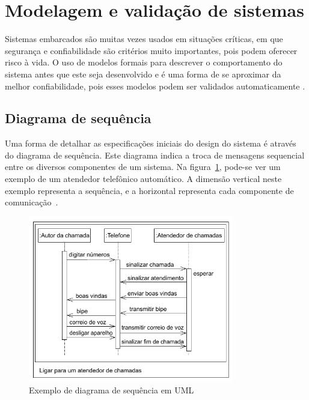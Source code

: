 

\section{Modelagem e validação de sistemas}
\label{sec:modelosformais}
Sistemas embarcados são muitas vezes usados em situações críticas, em que segurança e confiabilidade são critérios muito importantes, pois podem oferecer risco à vida. O uso de modelos formais para descrever o comportamento do sistema antes que este seja desenvolvido e é uma forma de se aproximar da melhor confiabilidade, pois esses modelos podem ser validados automaticamente \cite{edwards:1997}.

\subsection{Diagrama de sequência}
Uma forma de detalhar as especificações iniciais do design do sistema é através do diagrama de sequência. Este diagrama indica a troca de mensagens sequencial entre os diversos componentes de um sistema. Na figura~\ref{fig:seq_chart}, pode-se ver um exemplo de um atendedor telefônico automático. A dimensão vertical neste exemplo representa a sequência, e a horizontal representa cada componente de comunicação~\cite{marwedel:2010}.

\begin{figure}[!ht]
	\caption{\label{fig:seq_chart}Exemplo de diagrama de sequência em UML}
	\begin{center}
	    \includegraphics[width=0.8\textwidth]{resources/seq_chart_marwedel_1}
	\end{center}
\end{figure}

